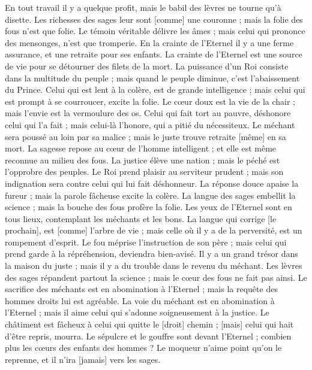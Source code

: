 \begin{multicols}{2}
En tout travail il y a quelque profit, mais le babil des lèvres ne tourne qu'à disette.
Les richesses des sages leur sont [comme] une couronne ; mais la folie des fous n'est que folie.
Le témoin véritable délivre les âmes ; mais celui qui prononce des mensonges, n'est que tromperie.
En la crainte de l'Eternel il y a une ferme assurance, et une retraite pour ses enfants.
La crainte de l'Eternel est une source de vie pour se détourner des filets de la mort.
La puissance d'un Roi consiste dans la multitude du peuple ; mais quand le peuple diminue, c'est l'abaissement du Prince.
Celui qui est lent à la colère, est de grande intelligence ; mais celui qui est prompt à se courroucer, excite la folie.
Le cœur doux est la vie de la chair ; mais l'envie est la vermoulure des os.
Celui qui fait tort au pauvre, déshonore celui qui l'a fait ; mais celui-là l'honore, qui a pitié du nécessiteux.
Le méchant sera poussé au loin par sa malice ; mais le juste trouve retraite [même] en sa mort.
La sagesse repose au cœur de l'homme intelligent ; et elle est même reconnue au milieu des fous.
La justice élève une nation ; mais le péché est l'opprobre des peuples.
Le Roi prend plaisir au serviteur prudent ; mais son indignation sera contre celui qui lui fait déshonneur.
\VerseOne{}La réponse douce apaise la fureur ; mais la parole fâcheuse excite la colère.
La langue des sages embellit la science ; mais la bouche des fous profère la folie.
Les yeux de l'Eternel sont en tous lieux, contemplant les méchants et les bons.
La langue qui corrige [le prochain], est [comme] l'arbre de vie ; mais celle où il y a de la perversité, est un rompement d'esprit.
Le fou méprise l'instruction de son père ; mais celui qui prend garde à la répréhension, deviendra bien-avisé.
Il y a un grand trésor dans la maison du juste ; mais il y a du trouble dans le revenu du méchant.
Les lèvres des sages répandent partout la science ; mais le cœur des fous ne fait pas ainsi.
Le sacrifice des méchants est en abomination à l'Eternel ; mais la requête des hommes droits lui est agréable.
La voie du méchant est en abomination à l'Eternel ; mais il aime celui qui s'adonne soigneusement à la justice.
Le châtiment est fâcheux à celui qui quitte le [droit] chemin ; [mais] celui qui hait d'être repris, mourra.
Le sépulcre et le gouffre sont devant l'Eternel ; combien plus les cœurs des enfants des hommes ?
Le moqueur n'aime point qu'on le reprenne, et il n'ira [jamais] vers les sages.

\end{multicols}
